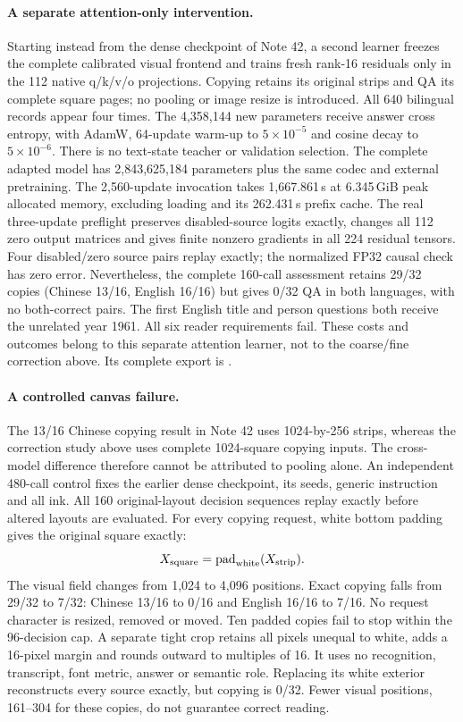 \documentclass[10pt,a4paper]{article}
\begin{document}
\paragraph{A separate attention-only intervention.}
Starting instead from the dense checkpoint of Note 42, a second learner
freezes the complete calibrated visual frontend and trains fresh rank-16
residuals only in the 112 native q/k/v/o projections. Copying retains its
original strips and QA its complete square pages; no pooling or image resize
is introduced. All 640 bilingual records appear four times. The 4,358,144
new parameters receive answer cross entropy, with AdamW, 64-update warm-up
to $5\times10^{-5}$ and cosine decay to $5\times10^{-6}$. There is no
text-state teacher or validation selection. The complete adapted model has
2,843,625,184 parameters plus the same codec and external pretraining.
The 2,560-update invocation takes 1,667.861\,s at 6.345\,GiB peak allocated
memory, excluding loading and its 262.431\,s prefix cache. The real
three-update preflight preserves disabled-source logits exactly, changes
all 112 zero output matrices and gives finite nonzero gradients in all
224 residual tensors. Four disabled/zero source pairs replay exactly;
the normalized FP32 causal check has zero error. Nevertheless, the complete
160-call assessment retains 29/32 copies (Chinese 13/16, English 16/16)
but gives 0/32 QA in both languages, with no both-correct pairs. The first
English title and person questions both receive the unrelated year 1961.
All six reader requirements fail. These costs and outcomes belong to this
separate attention learner, not to the coarse/fine correction above. Its
complete export is .

\paragraph{A controlled canvas failure.}
The 13/16 Chinese copying result in Note 42 uses 1024-by-256 strips, whereas
the correction study above uses complete 1024-square copying inputs. The
cross-model difference therefore cannot be attributed to pooling alone.
An independent 480-call control fixes the earlier dense checkpoint, its
seeds, generic instruction and all ink. All 160 original-layout decision
sequences replay exactly before altered layouts are evaluated. For every
copying request, white bottom padding gives the original square exactly:
\[
 X_{\rm square}=\operatorname{pad}_{\rm white}(X_{\rm strip}).
\]
The visual field changes from 1,024 to 4,096 positions. Exact copying falls
from 29/32 to 7/32: Chinese 13/16 to 0/16 and English 16/16 to 7/16.
No request character is resized, removed or moved. Ten padded copies fail
to stop within the 96-decision cap. A separate tight crop retains all pixels
unequal to white, adds a 16-pixel margin and rounds outward to multiples
of 16. It uses no recognition, transcript, font metric, answer or semantic
role. Replacing its white exterior reconstructs every source exactly, but
copying is 0/32. Fewer visual positions, 161--304 for these copies, do not
guarantee correct reading.
\end{document}
